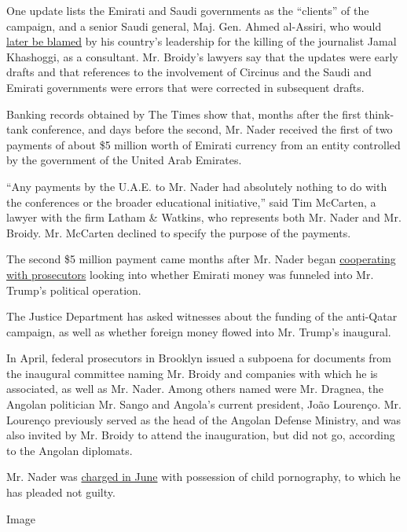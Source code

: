 One update lists the Emirati and Saudi governments as the ``clients'' of
the campaign, and a senior Saudi general, Maj. Gen. Ahmed al-Assiri, who
would
\href{https://www.nytimes.com/2018/10/18/world/middleeast/jamal-khashoggi-killing-saudi-arabia.html}{later
be blamed} by his country's leadership for the killing of the journalist
Jamal Khashoggi, as a consultant. Mr. Broidy's lawyers say that the
updates were early drafts and that references to the involvement of
Circinus and the Saudi and Emirati governments were errors that were
corrected in subsequent drafts.

Banking records obtained by The Times show that, months after the first
think-tank conference, and days before the second, Mr. Nader received
the first of two payments of about \$5 million worth of Emirati currency
from an entity controlled by the government of the United Arab Emirates.

``Any payments by the U.A.E. to Mr. Nader had absolutely nothing to do
with the conferences or the broader educational initiative,'' said Tim
McCarten, a lawyer with the firm Latham \& Watkins, who represents both
Mr. Nader and Mr. Broidy. Mr. McCarten declined to specify the purpose
of the payments.

The second \$5 million payment came months after Mr. Nader began
\href{https://www.nytimes.com/2018/03/06/us/politics/george-nader-special-counsel-mueller-cooperating-seychelles.html}{cooperating
with prosecutors} looking into whether Emirati money was funneled into
Mr. Trump's political operation.

The Justice Department has asked witnesses about the funding of the
anti-Qatar campaign, as well as whether foreign money flowed into Mr.
Trump's inaugural.

In April, federal prosecutors in Brooklyn issued a subpoena for
documents from the inaugural committee naming Mr. Broidy and companies
with which he is associated, as well as Mr. Nader. Among others named
were Mr. Dragnea, the Angolan politician Mr. Sango and Angola's current
president, João Lourenço. Mr. Lourenço previously served as the head of
the Angolan Defense Ministry, and was also invited by Mr. Broidy to
attend the inauguration, but did not go, according to the Angolan
diplomats.

Mr. Nader was
\href{https://www.nytimes.com/2019/06/03/us/politics/george-nader-child-pornography-arrest.html}{charged
in June} with possession of child pornography, to which he has pleaded
not guilty.

Image

